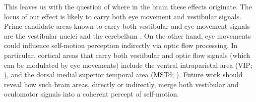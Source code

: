 This leaves us with the question of where in the brain these effects originate. The locus of our effect is likely to carry both eye movement and vestibular signals. Prime candidate areas known to carry both vestibular and eye movement signals are the vestibular nuclei \cite{henn1974,daunton1979} and the cerebellum \cite{waespe1981}. On the other hand, eye movements could influence self-motion perception indirectly via optic flow processing. In particular, cortical areas that carry both vestibular and optic flow signals (which can be modulated by eye movements) include the ventral intraparietal area (VIP; ), and the dorsal medial superior temporal area (MSTd; ). Future work should reveal how such brain areas, directly or indirectly, merge both vestibular and oculomotor signals into a coherent percept of self-motion.
